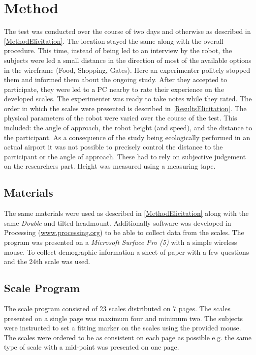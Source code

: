 \section{Method}
\label{Method2}
The test was conducted over the course of two days and otherwise as described in \autoref{MethodElicitation}. The location stayed the same along with the overall procedure. This time, instead of being led to an interview by the robot, the subjects were led a small distance in the direction of most of the available options in the wireframe (Food, Shopping, Gates). Here an experimenter politely stopped them and informed them about the ongoing study. After they accepted to participate, they were led to a PC nearby to rate their experience on the developed scales. The experimenter was ready to take notes while they rated. The order in which the scales were presented is described in \autoref{ResultsElicitation}. The physical parameters of the robot were varied over the course of the test. This included: the angle of approach, the robot height (and speed), and the distance to the participant. As a consequence of the study being ecologically performed in an actual airport it was not possible to precisely control the distance to the participant or the angle of approach. These had to rely on subjective judgement on the researchers part. Height was measured using a measuring tape.

\subsection{Materials}
The same materials were used as described in \autoref{MethodElicitation} along with the same \textit{Double} and tilted headmount. Additionally software was developed in Processing (\url{www.processing.org}) to be able to collect data from the scales. The program was presented on a \textit{Microsoft Surface Pro (5)} with a simple wireless mouse. To collect demographic information a sheet of paper with a few questions and the 24th scale was used.

\subsection{Scale Program}
The scale program consisted of 23 scales distributed on 7 pages. The scales presented on a single page was maximum four and minimum two. The subjects were instructed to set a fitting marker on the scales using the provided mouse. The scales were ordered to be as consistent on each page as possible e.g. the same type of scale with a mid-point was presented on one page.

